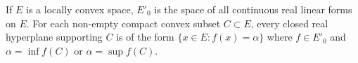 If $E$ is a locally convex space, $E'_0$ is the space of all continuous real linear forms on $E$. For each non-empty compact convex subset $C \subset E$, every closed real hyperplane supporting $C$ is of the form $\{x \in E : f(x) = \alpha\}$ where $f \in E'_0$ and $\alpha = \inf f(C)$ or $\alpha = \sup f(C)$.

